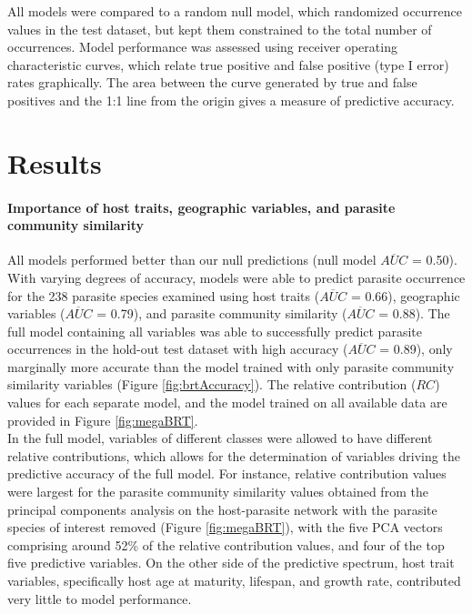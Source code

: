 \documentclass[12pt]{article}
\begin{document}
  All models were compared to a random null model, which randomized occurrence values in the test dataset, but kept them constrained to the total number of occurrences. Model performance was assessed using receiver operating characteristic curves, which relate true positive and false positive (type I error) rates graphically. The area between the curve generated by true and false positives and the 1:1 line from the origin gives a measure of predictive accuracy. 
  
   
\section*{Results}

  \paragraph{Importance of host traits, geographic variables, and parasite community similarity}
  All models performed better than our null predictions (null model $\overline{AUC}$ = 0.50). With varying degrees of accuracy, models were able to predict parasite occurrence for the 238 parasite species examined using host traits ($\overline{AUC}$ = 0.66), geographic variables ($\overline{AUC}$ = 0.79), and parasite community similarity ($\overline{AUC}$ = 0.88). The full model containing all variables was able to successfully predict parasite occurrences in the hold-out test dataset with high accuracy ($\overline{AUC}$ = 0.89), only marginally more accurate than the model trained with only parasite community similarity variables (Figure \ref{fig:brtAccuracy}). The relative contribution ($RC$) values for each separate model, and the model trained on all available data are provided in Figure \ref{fig:megaBRT}.  \\
  
  In the full model, variables of different classes were allowed to have different relative contributions, which allows for the determination of variables driving the predictive accuracy of the full model. For instance, relative contribution values were largest for the parasite community similarity values obtained from the principal components analysis on the host-parasite network with the parasite species of interest removed (Figure \ref{fig:megaBRT}), with the five PCA vectors comprising around 52\% of the relative contribution values, and four of the top five predictive variables. On the other side of the predictive spectrum, host trait variables, specifically host age at maturity, lifespan, and growth rate, contributed very little to model performance. \\
    
\end{document}
